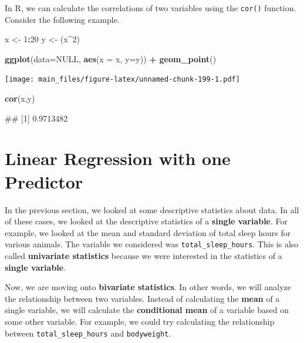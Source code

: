 \documentclass[
]{book}
\newenvironment{Shaded}{\begin{snugshade}}{\end{snugshade}}
\newcommand{\AttributeTok}[1]{\textcolor[rgb]{0.13,0.29,0.53}{#1}}
\newcommand{\ConstantTok}[1]{\textcolor[rgb]{0.56,0.35,0.01}{#1}}
\newcommand{\DecValTok}[1]{\textcolor[rgb]{0.00,0.00,0.81}{#1}}
\newcommand{\FunctionTok}[1]{\textcolor[rgb]{0.13,0.29,0.53}{\textbf{#1}}}
\newcommand{\NormalTok}[1]{#1}
\newcommand{\OtherTok}[1]{\textcolor[rgb]{0.56,0.35,0.01}{#1}}
\newcommand{\SpecialCharTok}[1]{\textcolor[rgb]{0.81,0.36,0.00}{\textbf{#1}}}
\begin{document}
In R, we can calculate the correlations of two variables using the \texttt{cor()} function. Consider the following example.

\begin{Shaded}
\begin{Highlighting}[]
\NormalTok{x }\OtherTok{\textless{}{-}} \DecValTok{1}\SpecialCharTok{:}\DecValTok{20}
\NormalTok{y }\OtherTok{\textless{}{-}}\NormalTok{ (x}\SpecialCharTok{\^{}}\DecValTok{2}\NormalTok{)}

\FunctionTok{ggplot}\NormalTok{(}\AttributeTok{data=}\ConstantTok{NULL}\NormalTok{, }\FunctionTok{aes}\NormalTok{(}\AttributeTok{x =}\NormalTok{ x, }\AttributeTok{y=}\NormalTok{y)) }\SpecialCharTok{+}
  \FunctionTok{geom\_point}\NormalTok{()}
\end{Highlighting}
\end{Shaded}

\texttt{[image: main\_files/figure-latex/unnamed-chunk-199-1.pdf]}

\begin{Shaded}
\begin{Highlighting}[]
\FunctionTok{cor}\NormalTok{(x,y)}
\end{Highlighting}
\end{Shaded}

\begin{Shaded}
\begin{Highlighting}[]
\NormalTok{\#\# [1] 0.9713482}
\end{Highlighting}
\end{Shaded}

\chapter{Linear Regression with one Predictor}\label{linear-regression-with-one-predictor}

In the previous section, we looked at some descriptive statistics about data. In all of these cases, we looked at the descriptive statistics of a \textbf{single variable}. For example, we looked at the mean and standard deviation of total sleep hours for various animals. The variable we considered was \texttt{total\_sleep\_hours}. This is also called \textbf{univariate statistics} because we were interested in the statistics of a \textbf{single variable}.

Now, we are moving onto \textbf{bivariate statistics}. In other words, we will analyze the relationship between two variables. Instead of calculating the \textbf{mean} of a single variable, we will calculate the \textbf{conditional mean} of a variable based on some other variable. For example, we could try calculating the relationship between \texttt{total\_sleep\_hours} and \texttt{bodyweight}.
\end{document}
